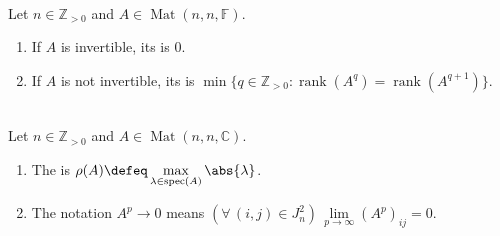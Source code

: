 \begin{definition} \label{def:matrix-index} \\
Let $n\in\mathbb{Z}_{>0}$ and $A\in\operatorname{Mat}(n,n,\mathbb{F})$.
\begin{enumerate}[label=(\roman*)]
\setlength{\itemsep}{0pt}
\item If $A$ is invertible, its  is $0$.
\item If $A$ is not invertible, its  is $\min\{q\in\mathbb{Z}_{>0}:\operatorname{rank}(A^q)=\operatorname{rank}(A^{q+1})\}$.
\end{enumerate}
\end{definition}

\begin{definition} \label{def:spectral-radius-and-convergent-matrix} \\
Let $n\in\mathbb{Z}_{>0}$ and $A\in\operatorname{Mat}(n,n,\mathbb{C})$.
\begin{enumerate}[label=(\roman*)]
\setlength{\itemsep}{0pt}
\item The  is $\rho(A)\defeq\max\limits_{\lambda\in\operatorname{spec}(A)}\abs{\lambda}$.
\item The notation $A^p\to0$ means $(\forall\,(i,j)\in J_n^2)\,\lim\limits_{p\to\infty}(A^p)_{ij}=0$.
\end{enumerate}
\end{definition}

